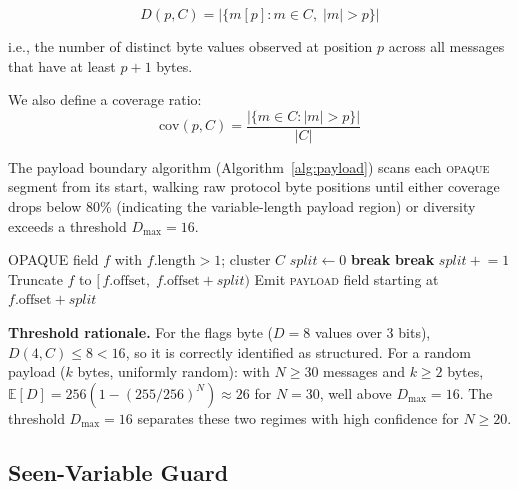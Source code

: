 \documentclass[letterpaper,twocolumn,10pt]{article}
\begin{document}
\begin{equation}
  D(p, C) = \bigl|\bigl\{ m[p] : m \in C,\; |m| > p \bigr\}\bigr|
  \label{eq:diversity}
\end{equation}

i.e., the number of distinct byte values observed at position $p$ across all
messages that have at least $p+1$ bytes.

We also define a coverage ratio:
\begin{equation}
  \text{cov}(p, C) = \frac{|\{m \in C : |m| > p\}|}{|C|}
\end{equation}

The payload boundary algorithm (Algorithm~\ref{alg:payload}) scans each
\textsc{opaque} segment from its start, walking raw protocol byte positions
until either coverage drops below 80\% (indicating the variable-length payload
region) or diversity exceeds a threshold $D_\text{max} = 16$.

\begin{algorithm}[t]
\caption{Raw-byte diversity payload detection}
\label{alg:payload}
\begin{algorithmic}[1]
\Require OPAQUE field $f$ with $f.\text{length} > 1$; cluster $C$
\State $\mathit{split} \gets 0$
    \State \textbf{break}
  \EndIf
    \State \textbf{break}
  \EndIf
  \State $\mathit{split} \mathrel{+}= 1$
\EndFor
{}
  \State Truncate $f$ to $[\,f.\text{offset},\; f.\text{offset} + \mathit{split})$
  \State Emit \textsc{payload} field starting at $f.\text{offset} + \mathit{split}$
\EndIf
\end{algorithmic}
\end{algorithm}

\textbf{Threshold rationale.}  For the flags byte ($D = 8$ values over 3 bits),
$D(4, C) \leq 8 < 16$, so it is correctly identified as structured.  For a
random payload ($k$ bytes, uniformly random): with $N \geq 30$ messages and
$k \geq 2$ bytes, $\mathbb{E}[D] = 256(1-(255/256)^N) \approx 26$ for
$N = 30$, well above $D_\text{max} = 16$.  The threshold $D_\text{max} = 16$
separates these two regimes with high confidence for $N \geq 20$.

\subsection{Seen-Variable Guard}
\end{document}
